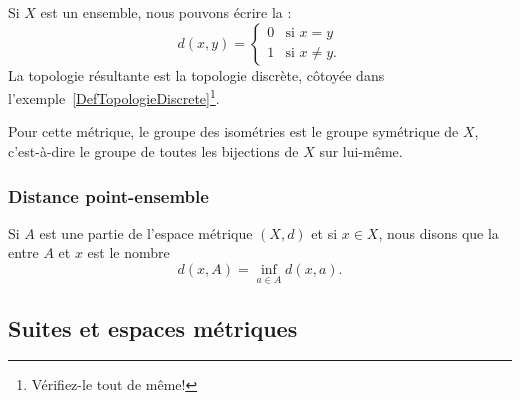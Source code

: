 \begin{example}
	Si \( X\) est un ensemble, nous pouvons écrire la  :
	\begin{equation}
		d(x,y)=\begin{cases}
			0 & \text{si } x=y             \\
			1 & \text{si } x\neq y\text{.}
		\end{cases}
	\end{equation}
	La topologie résultante est la topologie discrète, côtoyée dans l'exemple~\ref{DefTopologieDiscrete}\footnote{Vérifiez-le tout de même!}.

	Pour cette métrique, le groupe des isométries est le groupe symétrique de \( X\), c'est-à-dire le groupe de toutes les bijections de \( X\) sur lui-même.
\end{example}

\subsubsection{Distance point-ensemble}

\begin{definition}
	Si \( A\) est une partie de l'espace métrique \( (X,d)\) et si \( x\in X\), nous disons que la  entre \( A\) et \( x\) est le nombre
	\begin{equation}		\label{EqdefDistaA}
		d(x,A)=\inf_{a\in A}d(x,a).
	\end{equation}
\end{definition}
\newcommand{\CaptionFigDistanceEnsemble}{La distance entre \( x\) et \( A\) est donnée par la distance entre \( x\) et \( p\). Les distances entre \( x\) et les autres points de \( A\) sont plus grandes que \( d(x,p)\).}


\subsection{Suites et espaces métriques}



